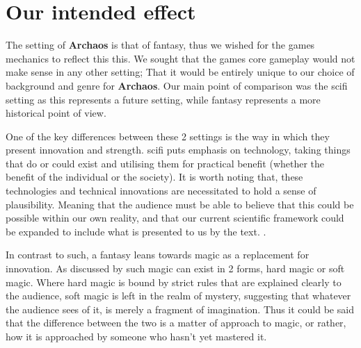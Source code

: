 \documentclass[12pt,a4paper]{report}
\begin{document}

\section{Our intended effect} \label{goal1}

The setting of \textbf{Archaos} is that of \gls{fantasy}, thus we wished for the games mechanics to reflect this this. We sought that the games core gameplay would not make sense in any other setting; That it would be entirely unique to our choice of background and genre for \textbf{Archaos}. Our main point of comparison was the \gls{scifi} setting as this represents a future setting, while \gls{fantasy} represents a more historical point of view.

One of the key differences between these 2 settings is the way in which they present innovation and strength. \gls{scifi} puts emphasis on technology, taking things that do or could exist and utilising them for practical benefit (whether the benefit of the individual or the society). It is worth noting that, these technologies and technical innovations are necessitated to hold a sense of plausibility. Meaning that the audience must be able to believe that this could be possible within our own reality, and that our current scientific framework could be expanded to include what is presented to us by the text. \parencite{long2011defining}.

In contrast to such, a \gls{fantasy} leans towards magic as a replacement for innovation. As discussed by \cite{carver2024duality} such magic can exist in 2 forms, hard magic or soft magic. Where hard magic is bound by strict rules that are explained clearly to the audience, soft magic is left in the realm of mystery, suggesting that whatever the audience sees of it, is merely a fragment of imagination. Thus it could be said that the difference between the two is a matter of approach to magic, or rather, how it is approached by someone who hasn't yet mastered it.
\end{document}
